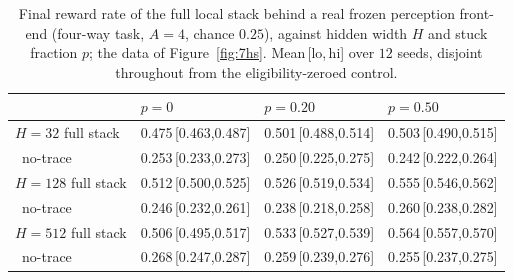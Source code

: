 \begin{table}[H]
    \caption[Source data: hybrid stack at array scale (Fig.~\ref{fig:7hs}).]{Final
    reward rate of the full local stack behind a real frozen perception front-end
    (four-way task, $A=4$, chance $0.25$), against hidden width $H$ and stuck fraction
    $p$; the data of Figure~\ref{fig:7hs}. Mean\,[lo,\,hi] over $12$ seeds, disjoint
    throughout from the eligibility-zeroed control.}
    \begin{center}
    \footnotesize
    \begin{tabularx}{\textwidth}{@{}l Y Y Y@{}}
    \toprule
    & $p{=}0$ & $p{=}0.20$ & $p{=}0.50$ \\
    \midrule
    $H{=}32$  full stack & 0.475\,\tiny[0.463,0.487] & 0.501\,\tiny[0.488,0.514] & 0.503\,\tiny[0.490,0.515] \\
    \quad\ no-trace      & 0.253\,\tiny[0.233,0.273] & 0.250\,\tiny[0.225,0.275] & 0.242\,\tiny[0.222,0.264] \\
    $H{=}128$ full stack & 0.512\,\tiny[0.500,0.525] & 0.526\,\tiny[0.519,0.534] & 0.555\,\tiny[0.546,0.562] \\
    \quad\ no-trace      & 0.246\,\tiny[0.232,0.261] & 0.238\,\tiny[0.218,0.258] & 0.260\,\tiny[0.238,0.282] \\
    $H{=}512$ full stack & 0.506\,\tiny[0.495,0.517] & 0.533\,\tiny[0.527,0.539] & 0.564\,\tiny[0.557,0.570] \\
    \quad\ no-trace      & 0.268\,\tiny[0.247,0.287] & 0.259\,\tiny[0.239,0.276] & 0.255\,\tiny[0.237,0.275] \\
    \bottomrule
    \end{tabularx}
    \label{table:E8}
    \end{center}
    \vspace*{-\baselineskip}
\end{table}


